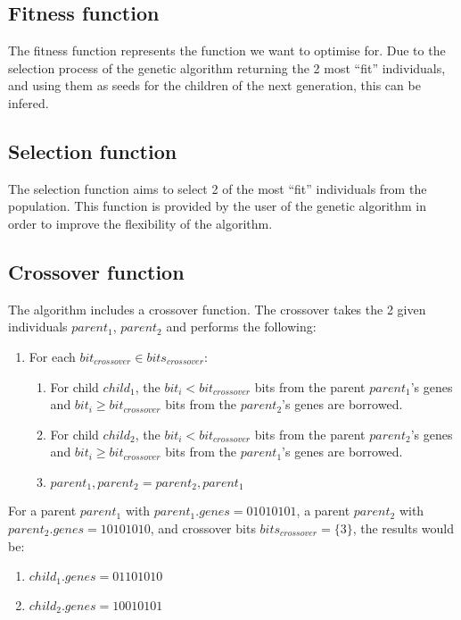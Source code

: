 \documentclass[conference]{IEEEtran}
\begin{document}
\subsection{Fitness function}
The fitness function represents the function we want to optimise for. Due to the selection process of the genetic
algorithm returning the 2 most ``fit'' individuals, and using them as seeds for the children of the next generation,
this can be infered.

\subsection{Selection function}
The selection function aims to select 2 of the most ``fit'' individuals from the population. This function is provided
by the user of the genetic algorithm in order to improve the flexibility of the algorithm.

\subsection{Crossover function}
The algorithm includes a crossover function. The crossover takes the 2 given individuals $parent_1$, $parent_2$ and performs the following:

\begin{enumerate}
    \item For each $bit_{crossover} \in bits_{crossover}$:
    \begin{enumerate}
        \item For child $child_1$, the $bit_i < bit_{crossover}$ bits from the parent $parent_1$'s genes and $bit_i \ge bit_{crossover}$ bits from the $parent_2$'s genes are borrowed.
        \item For child $child_2$, the $bit_i < bit_{crossover}$ bits from the parent $parent_2$'s genes and $bit_i \ge bit_{crossover}$ bits from the $parent_1$'s genes are borrowed.
        \item $parent_1, parent_2 = parent_2, parent_1$
    \end{enumerate}
\end{enumerate}

For a parent $parent_1$ with $parent_1.genes = 01010101$, a parent $parent_2$ with $parent_2.genes = 10101010$, and crossover bits $bits_{crossover} = \{3\}$, the results would be:

\begin{enumerate}
    \item $child_1.genes = 01101010$
    \item $child_2.genes = 10010101$
\end{enumerate}
\end{document}
